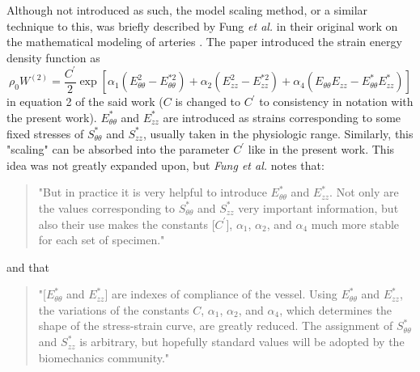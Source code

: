     Although not introduced as such, the model scaling method, or a similar technique to this, was briefly described by Fung \textit{et al.} in their original work on the mathematical modeling of arteries \cite{fung_pseudoelasticity_1979}. The paper introduced the strain energy density function as 
\begin{equation}\label{eqn:fungarterymodel}
\rho_0 W^{(2)} = \frac{C^\prime}{2}\operatorname{exp}\left[\alpha_1 \left(E_{\theta\theta}^2 - E_{\theta\theta}^{*2} \right) + \alpha_2 \left(E_{zz}^2 - E_{zz}^{*2} \right) + \alpha_4 \left(E_{\theta\theta}E_{zz} - E_{\theta\theta}^*E_{zz}^* \right) \right]
\end{equation}
    in equation 2 of the said work ($C$ is changed to $C^\prime$ to consistency in notation with the present work). $E_{\theta\theta}^*$ and $E_{zz}^*$ are introduced as strains corresponding to some fixed stresses of $S_{\theta\theta}^*$ and $S_{zz}^*$, usually taken in the physiologic range. Similarly, this "scaling" can be absorbed into the parameter $C^\prime$ like in the present work. This idea was not greatly expanded upon, but \textit{Fung et al.} notes that:
\begin{quotation}
"But in practice it is very helpful to introduce $E_{\theta\theta}^*$ and $E_{zz}^*$. Not only are the values corresponding to $S_{\theta\theta}^*$ and $S_{zz}^*$ very important information, but also their use makes the constants [$C^\prime$], $\alpha_1$, $\alpha_2$, and $\alpha_4$ much more stable for each set of specimen." \cite{fung_pseudoelasticity_1979}
\end{quotation} 
    and that 
\begin{quotation}
"[$E_{\theta\theta}^*$ and $E_{zz}^*$] are indexes of compliance of the vessel. Using $E_{\theta\theta}^*$ and $E_{zz}^*$, the variations of the constants $C$, $\alpha_1$, $\alpha_2$, and $\alpha_4$, which determines the shape of the stress-strain curve, are greatly reduced. The assignment of $S_{\theta\theta}^*$ and $S_{zz}^*$ is arbitrary, but hopefully standard values will be adopted by the biomechanics community." \cite{fung_pseudoelasticity_1979}
\end{quotation}


